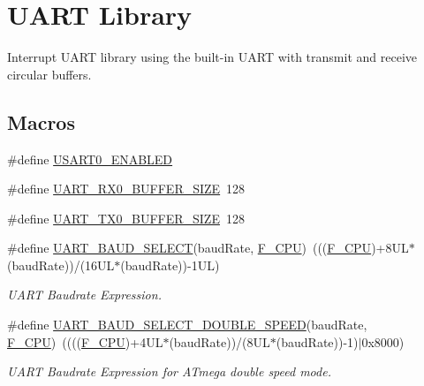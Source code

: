\hypertarget{group__avr-uart}{}\section{U\+A\+R\+T Library}
\label{group__avr-uart}


Interrupt U\+A\+R\+T library using the built-\/in U\+A\+R\+T with transmit and receive circular buffers.  


\subsection*{Macros}
\begin{DoxyCompactItemize}
\item 
\#define \hyperlink{group__avr-uart_ga610107710886611e83a969b670164787}{U\+S\+A\+R\+T0\+\_\+\+E\+N\+A\+B\+L\+E\+D}
\item 
\#define \hyperlink{group__avr-uart_gab8bc9ef5bc3b98f92244ad33e3aa710b}{U\+A\+R\+T\+\_\+\+R\+X0\+\_\+\+B\+U\+F\+F\+E\+R\+\_\+\+S\+I\+Z\+E}~128
\item 
\#define \hyperlink{group__avr-uart_gaa4710900760f3d4aed60b8df217816af}{U\+A\+R\+T\+\_\+\+T\+X0\+\_\+\+B\+U\+F\+F\+E\+R\+\_\+\+S\+I\+Z\+E}~128
\item 
\#define \hyperlink{group__avr-uart_ga180ede29fa62d3514484ae6450b4ffbe}{U\+A\+R\+T\+\_\+\+B\+A\+U\+D\+\_\+\+S\+E\+L\+E\+C\+T}(baud\+Rate,  \hyperlink{app__config_8h_a43bafb28b29491ec7f871319b5a3b2f8}{F\+\_\+\+C\+P\+U})~(((\hyperlink{app__config_8h_a43bafb28b29491ec7f871319b5a3b2f8}{F\+\_\+\+C\+P\+U})+8\+U\+L$\ast$(baud\+Rate))/(16\+U\+L$\ast$(baud\+Rate))-\/1\+U\+L)
\begin{DoxyCompactList}\small\item\em U\+A\+R\+T Baudrate Expression. \end{DoxyCompactList}\item 
\#define \hyperlink{group__avr-uart_ga77aa486f11fb4e932bba24dff9754921}{U\+A\+R\+T\+\_\+\+B\+A\+U\+D\+\_\+\+S\+E\+L\+E\+C\+T\+\_\+\+D\+O\+U\+B\+L\+E\+\_\+\+S\+P\+E\+E\+D}(baud\+Rate,  \hyperlink{app__config_8h_a43bafb28b29491ec7f871319b5a3b2f8}{F\+\_\+\+C\+P\+U})~((((\hyperlink{app__config_8h_a43bafb28b29491ec7f871319b5a3b2f8}{F\+\_\+\+C\+P\+U})+4\+U\+L$\ast$(baud\+Rate))/(8\+U\+L$\ast$(baud\+Rate))-\/1)$\vert$0x8000)
\begin{DoxyCompactList}\small\item\em U\+A\+R\+T Baudrate Expression for A\+Tmega double speed mode. \end{DoxyCompactList}\item 

\end{DoxyCompactItemize}
